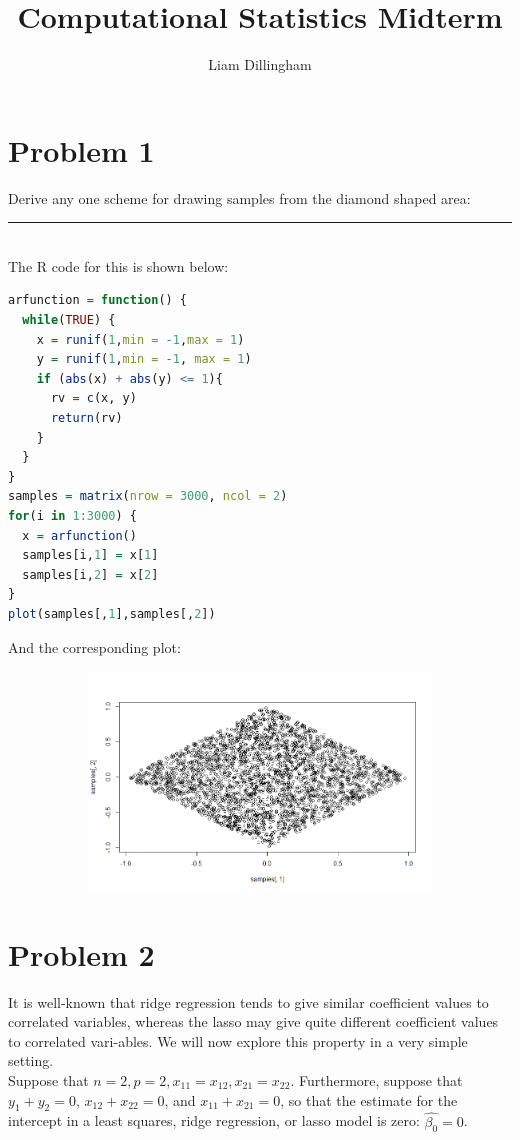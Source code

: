 \documentclass[20pt]{article} %
\title{Computational Statistics Midterm}
\author{Liam Dillingham}
\begin{document}
\maketitle

\section{Problem 1}
Derive any one scheme for drawing samples from the diamond shaped area:\\
\noindent\rule{2cm}{0.4pt} \\
The R code for this is shown below:
\begin{lstlisting}[language=R]
arfunction = function() {
  while(TRUE) {
    x = runif(1,min = -1,max = 1)
    y = runif(1,min = -1, max = 1)
    if (abs(x) + abs(y) <= 1){
      rv = c(x, y)
      return(rv)
    }
  }
}
samples = matrix(nrow = 3000, ncol = 2)
for(i in 1:3000) {
  x = arfunction()
  samples[i,1] = x[1]
  samples[i,2] = x[2]
}
plot(samples[,1],samples[,2])
\end{lstlisting}
And the corresponding plot: 
\begin{figure}[!htbp]
  	\centering
   	\begin{subfigure}[p]{0.55\linewidth}
    	\includegraphics[width=\linewidth]{../figures/midterm1.png}
   	\end{subfigure}
\end{figure} 
\newpage
\section{Problem 2}
It is well-known that ridge regression tends to give similar coefficient values to correlated variables, whereas the lasso may give quite different coefficient values to correlated vari-ables. We will now explore this property in a very simple setting.\\
Suppose that $n = 2, p = 2, x_{11} = x_{12}, x_{21} =x_{22}$. Furthermore, suppose that $y_1 + y_2 = 0$, $x_{12}+x_{22}=0$, and $x_{11} + x_{21} = 0$, so that the estimate for the intercept in a least squares, ridge regression, or lasso model is zero: $\hat{\beta_0} = 0$.
\end{document}
